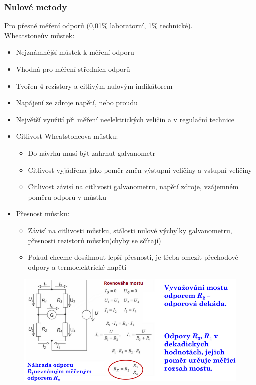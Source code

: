\subsubsection{Nulové metody}
Pro přesné měření odporů (0,01\% laboratorní, 1\% technické).\\
Wheatstoneův můstek:
\begin{itemize}
    \item Nejznámnější můstek k měření odporu
    \item Vhodná pro měření středních odporů
    \item Tvořen 4 rezistory a citlivým nulovým indikátorem
    \item Napájení ze zdroje napětí, nebo proudu
    \item Největší využití při měření neelektrických veličin a v regulační technice
    \item Citlivost Wheatstoneova můstku:
          \begin{itemize}
              \item Do návrhu musí být zahrnut galvanometr
              \item Citlivost vyjádřena jako poměr změn výstupní veličiny a vstupní veličiny
              \item Citlivost závisí na citlivosti galvanometru, napětí zdroje, vzájemném poměru odporů v můstku
          \end{itemize}
    \item Přesnost můstku:
          \begin{itemize}
              \item Závisí na citlivosti můstku, stálosti nulové výchylky galvanometru, přesnosti rezistorů můstku(chyby se sčítají)
              \item Pokud chceme dosáhnout lepší přesnosti, je třeba omezit přechodové odpory a termoelektrické napětí
          \end{itemize}
\end{itemize}
\begin{figure}[h!]
    \centering
    \includegraphics[scale = 0.3]{images/Wheatstone.png}
\end{figure}

